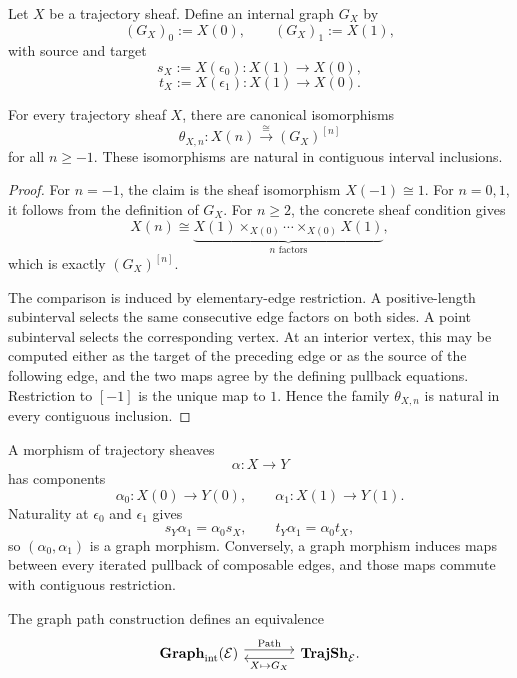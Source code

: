 Let \(X\) be a trajectory sheaf. Define an internal graph \(G_X\) by
\[
    (G_X)_0:=X(0),
    \qquad
    (G_X)_1:=X(1),
\]
with source and target
\[
    s_X:=X(\epsilon_0):X(1)\to X(0),
\]
\[
    t_X:=X(\epsilon_1):X(1)\to X(0).
\]

\begin{proposition}
\label{prop:reconstruction-length-zero-one}
For every trajectory sheaf \(X\), there are canonical isomorphisms
\[
    \theta_{X,n}:
    X(n)
    \xrightarrow{\cong}
    (G_X)^{[n]}
\]
for all \(n\geq-1\). These isomorphisms are natural in contiguous interval
inclusions.
\end{proposition}

\begin{proof}
For \(n=-1\), the claim is the sheaf isomorphism \(X(-1)\cong1\). For
\(n=0,1\), it follows from the definition of \(G_X\). For \(n\geq2\), the
concrete sheaf condition gives
\[
    X(n)
    \cong
    \underbrace{
    X(1)\times_{X(0)}\cdots\times_{X(0)}X(1)
    }_{n\text{ factors}},
\]
which is exactly \((G_X)^{[n]}\).

The comparison is induced by elementary-edge restriction. A positive-length
subinterval selects the same consecutive edge factors on both sides. A point
subinterval selects the corresponding vertex. At an interior vertex, this
may be computed either as the target of the preceding edge or as the source
of the following edge, and the two maps agree by the defining pullback
equations. Restriction to \([-1]\) is the unique map to \(1\). Hence the
family \(\theta_{X,n}\) is natural in every contiguous inclusion.
\end{proof}

A morphism of trajectory sheaves
\[
    \alpha:X\to Y
\]
has components
\[
    \alpha_0:X(0)\to Y(0),
    \qquad
    \alpha_1:X(1)\to Y(1).
\]
Naturality at \(\epsilon_0\) and \(\epsilon_1\) gives
\[
    s_Y\alpha_1=\alpha_0s_X,
    \qquad
    t_Y\alpha_1=\alpha_0t_X,
\]
so \((\alpha_0,\alpha_1)\) is a graph morphism. Conversely, a graph morphism
induces maps between every iterated pullback of composable edges, and those
maps commute with contiguous restriction.

\begin{theorem}
\label{thm:graph-trajectory-sheaf-equivalence}
The graph path construction defines an equivalence
\[
\begin{tikzcd}[column sep=large]
    \mathbf{Graph}_{\mathrm{int}}(\mathcal E)
        \arrow[r, shift left=0.7ex, "{\operatorname{Path}}"]
    &
    \mathbf{TrajSh}_{\mathcal E}
        \arrow[l, shift left=0.7ex, "{X\mapsto G_X}"] .
\end{tikzcd}
\]
\end{theorem}

